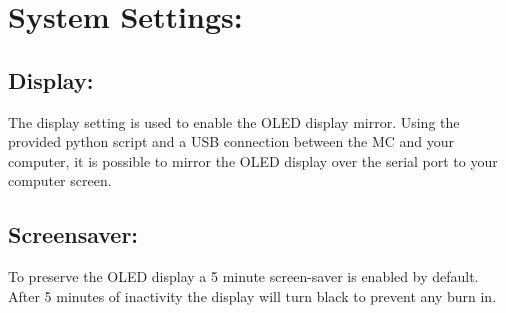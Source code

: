 \section{System Settings:}
\subsection{Display:}
The display setting is used to enable the OLED display mirror. Using the provided python script and a USB connection between the MC and your computer, it is possible to mirror the OLED display over the serial port to your computer screen.
\subsection{Screensaver:}
To preserve the OLED display a 5 minute screen-saver is enabled by default. After 5 minutes of inactivity the display will turn black to prevent any burn in.
